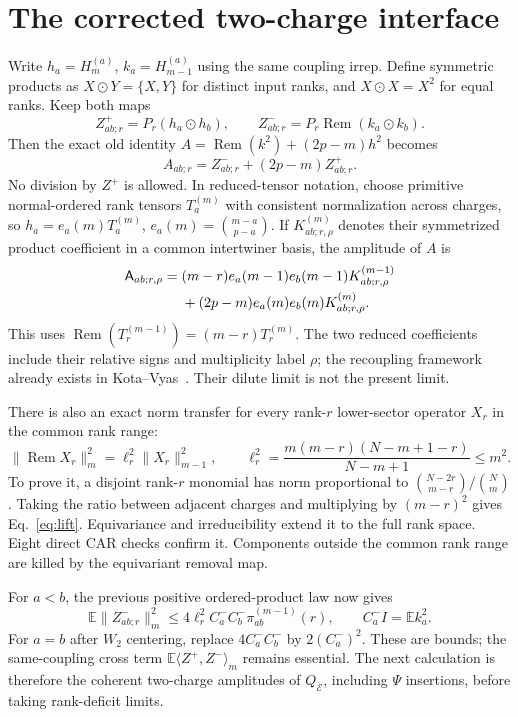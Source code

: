 \documentclass[11pt,a4paper]{article}
\newcommand{\EE}{\mathbb E}
\newcommand{\core}{\mathcal E}
\DeclareMathOperator{\Rem}{Rem}
\begin{document}
\newpage
\section{The corrected two-charge interface}
Write $h_a=H_m^{(a)}$, $k_a=H_{m-1}^{(a)}$ using the same coupling
irrep. Define symmetric products as $X\odot Y=\{X,Y\}$ for distinct
input ranks, and $X\odot X=X^2$ for equal ranks. Keep both maps
\begin{equation}
 Z^+_{ab;r}=P_r(h_a\odot h_b),\qquad
 Z^-_{ab;r}=P_r\Rem(k_a\odot k_b).
\end{equation}
Then the exact old identity $A=\Rem(k^2)+(2p-m)h^2$ becomes
\begin{equation}
 A_{ab;r}=Z^-_{ab;r}+(2p-m)Z^+_{ab;r}.
\end{equation}
No division by $Z^+$ is allowed. In reduced-tensor notation, choose
primitive normal-ordered rank tensors $T_a^{(m)}$ with consistent
normalization across charges, so
$h_a=e_a(m)T_a^{(m)}$, $e_a(m)=\binom{m-a}{p-a}$.
If $K^{(m)}_{ab;r,\rho}$ denotes their symmetrized product coefficient
in a common intertwiner basis, the amplitude of $A$ is
\begin{align}
 \mathsf A_{ab;r,\rho}
 ={}&(m-r)e_a(m-1)e_b(m-1)K^{(m-1)}_{ab;r,\rho}\notag\\
 &+(2p-m)e_a(m)e_b(m)K^{(m)}_{ab;r,\rho}.
 \label{eq:twocharge}
\end{align}
This uses $\Rem(T_r^{(m-1)})=(m-r)T_r^{(m)}$. The two reduced
coefficients include their relative signs and multiplicity label
$\rho$; the recoupling framework already exists in
Kota--Vyas~\cite{KV}. Their dilute limit is not the present limit.

There is also an exact norm transfer for every rank-$r$ lower-sector
operator $X_r$ in the common rank range:
\begin{equation}
 \|\Rem X_r\|_m^2=\ell_r^2\|X_r\|_{m-1}^2,\qquad
 \ell_r^2=\frac{m(m-r)(N-m+1-r)}{N-m+1}\le m^2.
 \label{eq:lift}
\end{equation}
To prove it, a disjoint rank-$r$ monomial has norm proportional to
$\binom{N-2r}{m-r}/\binom Nm$. Taking the ratio between adjacent
charges and multiplying by $(m-r)^2$ gives Eq.~\eqref{eq:lift}.
Equivariance and irreducibility extend it to the full rank space.
Eight direct CAR checks confirm it. Components outside the common
rank range are killed by the equivariant removal map.

For $a<b$, the previous positive ordered-product law now gives
\begin{equation}
 \EE\|Z^-_{ab;r}\|_m^2
 \le4\ell_r^2 C_a^-C_b^-\pi^{(m-1)}_{ab}(r),
 \qquad C_a^-I=\EE k_a^2.
\end{equation}
For $a=b$ after $W_2$ centering, replace $4C_a^-C_b^-$ by
$2(C_a^-)^2$. These are bounds; the same-coupling cross term
$\EE\langle Z^+,Z^-\rangle_m$ remains essential. The next calculation
is therefore the coherent two-charge amplitudes of $Q_{\core}$,
including $\Psi$ insertions, before taking rank-deficit limits.
\end{document}
